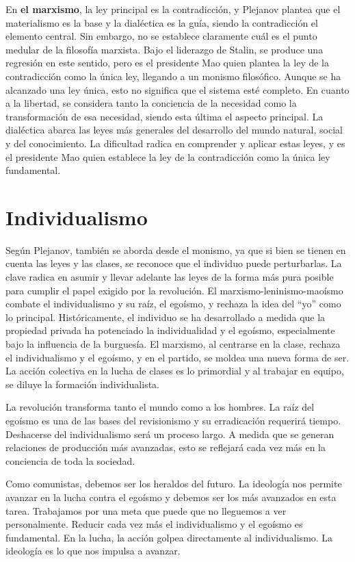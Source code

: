 \documentclass[
  letterpaper,
  DIV=11,
  numbers=noendperiod]{scrartcl}
\begin{document}
En \textbf{el marxismo}, la ley principal es la contradicción, y
Plejanov plantea que el materialismo es la base y la dialéctica es la
guía, siendo la contradicción el elemento central. Sin embargo, no se
establece claramente cuál es el punto medular de la filosofía marxista.
Bajo el liderazgo de Stalin, se produce una regresión en este sentido,
pero es el presidente Mao quien plantea la ley de la contradicción como
la única ley, llegando a un monismo filosófico. Aunque se ha alcanzado
una ley única, esto no significa que el sistema esté completo. En cuanto
a la libertad, se considera tanto la conciencia de la necesidad como la
transformación de esa necesidad, siendo esta última el aspecto
principal. La dialéctica abarca las leyes más generales del desarrollo
del mundo natural, social y del conocimiento. La dificultad radica en
comprender y aplicar estas leyes, y es el presidente Mao quien establece
la ley de la contradicción como la única ley fundamental.

\hypertarget{individualismo}{%
\section{Individualismo}\label{individualismo}}

Según Plejanov, también se aborda desde el monismo, ya que si bien se
tienen en cuenta las leyes y las clases, se reconoce que el individuo
puede perturbarlas. La clave radica en asumir y llevar adelante las
leyes de la forma más pura posible para cumplir el papel exigido por la
revolución. El marxismo-leninismo-maoísmo combate el individualismo y su
raíz, el egoísmo, y rechaza la idea del ``yo'' como lo principal.
Históricamente, el individuo se ha desarrollado a medida que la
propiedad privada ha potenciado la individualidad y el egoísmo,
especialmente bajo la influencia de la burguesía. El marxismo, al
centrarse en la clase, rechaza el individualismo y el egoísmo, y en el
partido, se moldea una nueva forma de ser. La acción colectiva en la
lucha de clases es lo primordial y al trabajar en equipo, se diluye la
formación individualista.

La revolución transforma tanto el mundo como a los hombres. La raíz del
egoísmo es una de las bases del revisionismo y su erradicación requerirá
tiempo. Deshacerse del individualismo será un proceso largo. A medida
que se generan relaciones de producción más avanzadas, esto se reflejará
cada vez más en la conciencia de toda la sociedad.

Como comunistas, debemos ser los heraldos del futuro. La ideología nos
permite avanzar en la lucha contra el egoísmo y debemos ser los más
avanzados en esta tarea. Trabajamos por una meta que puede que no
lleguemos a ver personalmente. Reducir cada vez más el individualismo y
el egoísmo es fundamental. En la lucha, la acción golpea directamente al
individualismo. La ideología es lo que nos impulsa a avanzar.


\printbibliography
\end{document}
